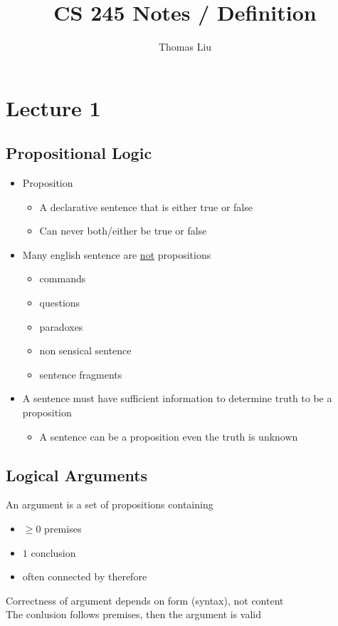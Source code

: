 \documentclass[11pt]{article}
\title{CS 245 Notes / Definition}
\author{Thomas Liu}
\begin{document}
\maketitle
\tableofcontents
\newpage

\section{Lecture 1}
\subsection{Propositional Logic}
\begin{itemize}
    \item Proposition
    \begin{itemize}
        \item A declarative sentence that is either true or false
        \item Can never both/either be true or false
    \end{itemize}
    \item Many english sentence are \underline{not} propositions
    \begin{itemize}
        \item commands 
        \item questions
        \item paradoxes
        \item non sensical sentence 
        \item sentence fragments
    \end{itemize}
    \item A sentence must have sufficient information to determine truth to be a proposition 
    \begin{itemize}
        \item A sentence can be a proposition even the truth is unknown
    \end{itemize}
\end{itemize}
\subsection{Logical Arguments}
An argument is a set of propositions containing
\begin{itemize}
    \item $\geq 0$ premises
    \item $1$ conclusion
    \item often connected by therefore
\end{itemize}
Correctness of argument depends on form (syntax), not content \\
The conlusion follows premises, then the argument is valid
\end{document}
